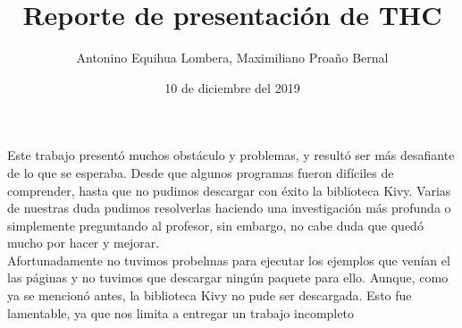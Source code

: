 \documentclass[]{article}
\title{Reporte de presentación de THC}
\author{Antonino Equihua Lombera, Maximiliano Proaño Bernal}
\date{10 de diciembre del 2019}
\begin{document}
	\maketitle
Este trabajo presentó muchos obstáculo y problemas, y resultó ser más desafiante de lo que se esperaba. Desde que algunos programas fueron difíciles de comprender, hasta que no pudimos descargar con éxito la biblioteca Kivy. Varias de nuestras duda pudimos resolverlas haciendo una investigación más profunda o simplemente preguntando al profesor, sin embargo, no cabe duda que quedó mucho por hacer y mejorar.\\

Afortunadamente no tuvimos probelmas para ejecutar los ejemplos que venían el las páginas y no tuvimos que descargar ningún paquete para ello. Aunque, como ya se mencionó antes, la biblioteca Kivy no pude ser descargada.
Esto fue lamentable, ya que nos limita a entregar un trabajo incompleto
\maketitle


\section{}
\end{document}

